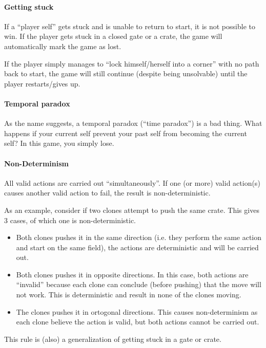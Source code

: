 \paragraph{Getting stuck}
If a ``player self'' gets stuck and is unable to return to start, it
is not possible to win.  If the player gets stuck in a closed gate or
a crate, the game will automatically mark the game as lost.

If the player simply manages to ``lock himself/herself into a corner''
with no path back to start, the game will still continue (despite being
unsolvable) until the player restarts/gives up.

\paragraph{Temporal paradox}
\label{temporal-paradox}
As the name suggests, a temporal paradox (``time paradox'') is a bad
thing.  What happens if your current self prevent your past self from
becoming the current self?  In this game, you simply lose.

\paragraph{Non-Determinism}
All valid actions are carried out ``simultaneously''.  If one (or
more) valid action(s) causes another valid action to fail, the result
is non-deterministic.

As an example, consider if two clones attempt to push the same
crate.  This gives 3 cases, of which one is non-deterministic.

\begin{itemize}
\item Both clones pushes it in the same direction (i.e. they perform
  the same action and start on the same field), the actions are
  deterministic and will be carried out.
\item Both clones pushes it in opposite directions.  In this case,
  both actions are ``invalid'' because each clone can conclude (before
  pushing) that the move will not work.  This is deterministic and
  result in none of the clones moving.
\item The clones pushes it in ortogonal directions.  This causes
  non-determinism as each clone believe the action is valid, but
  both actions cannot be carried out.
\end{itemize}

This rule is (also) a generalization of getting stuck in a gate or
crate.

